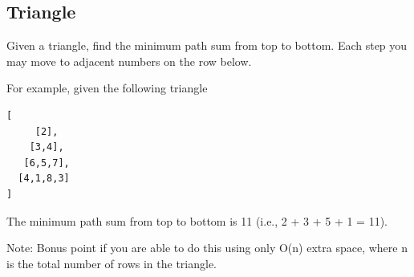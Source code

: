 \documentclass[12pt]{book}
\begin{document}
\subsection{Triangle}
\label{sec-14-2-9}
Given a triangle, find the minimum path sum from top to bottom. Each step you may move to adjacent numbers on the row below.

For example, given the following triangle
\lstset{language=java,label= ,caption= ,numbers=none}
\begin{lstlisting}
[
     [2],
    [3,4],
   [6,5,7],
  [4,1,8,3]
]
\end{lstlisting}

The minimum path sum from top to bottom is 11 (i.e., 2 + 3 + 5 + 1 = 11).

Note: Bonus point if you are able to do this using only O(n) extra space, where n is the total number of rows in the triangle.
\end{document}

